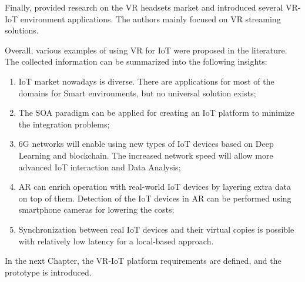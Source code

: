 Finally, \cite{hu_virtual_2021} provided research on the VR headsets market and introduced several VR-IoT environment applications. The authors mainly focused on VR streaming solutions.

Overall, various examples of using VR for IoT were proposed in the literature. The collected information can be summarized into the following insights:
\begin{enumerate}
    \item IoT market nowadays is diverse. There are applications for most of the domains for Smart environments, but no universal solution exists;
   \item The SOA paradigm can be applied for creating an IoT platform to minimize the integration problems;
    \item 6G networks will enable using new types of IoT devices based on Deep Learning and blockchain. The increased network speed will allow more advanced IoT interaction and Data Analysis;
    \item AR can enrich operation with real-world IoT devices by layering extra data on top of them. Detection of the IoT devices in AR can be performed using smartphone cameras for lowering the costs;
    \item Synchronization between real IoT devices and their virtual copies is possible with relatively low latency for a local-based approach.
\end{enumerate}

In the next Chapter, the VR-IoT platform requirements are defined, and the prototype is introduced.